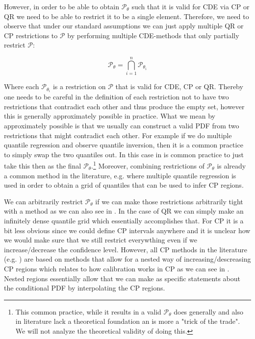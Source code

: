 However, in order to be able to obtain $\mathcal{P}_\theta$ such that it is valid for CDE via CP or QR we need to be able to restrict it to be a single element. Therefore, we need to observe that under our standard assumptions %
we can just apply multiple QR or CP restrictions to $\mathcal{P}$ by performing multiple CDE-methods that only partially restrict $\mathcal{P}$:

\begin{equation}
    \mathcal{P}_{\theta} = \bigcap_{i=1}^n \mathcal{P}_{\theta_i}
\end{equation}

Where each $\mathcal{P}_{\theta_i}$ is a restriction on $\mathcal{P}$ that is valid for CDE, CP or QR. Thereby one needs to be careful in the definition of each restriction not to have two restrictions that contradict each other and thus produce the empty set, however this is generally approximately possible in practice. What we mean by approximately possible is that we usually can construct a valid PDF from two restrictions that might contradict each other. For example if we do multiple quantile regression and observe quantile inversion, then it is a common practice to simply swap the two quantiles out. In this case in is common practice to just take this then as the final $\mathcal{P}_{\theta}$.\footnote{This common practice, while it results in a valid $\mathcal{P}_{\theta}$ does generally and also in literature lack a theoretical foundation an is more a "trick of the trade". We will not analyze the theoretical validity of doing this.} Moreover, combining restrictions of $\mathcal{P}_\theta$ is already a common method in the literature, e.g. \cite{sesia2021conformal} where multiple quantile regression is used in order to obtain a grid of quantiles that can be used to infer CP regions.

We can arbitrarily restrict $\mathcal{P}_\theta$ if we can make those restrictions arbitrarily tight with a method as we can also see in . In the case of QR we can simply make an infinitely dense quantile grid which essentially accomplishes that. For CP it is a bit less obvious since we could define CP intervals anywhere and it is unclear how we would make sure that we still restrict everywthing even if we increase/decrease the confidence level. However, all CP methods in the literature (e.g. \cite{sesia2021conformal, chernozhukov2021distributional}) are based on methods that allow for a nested way of increasing/descreasing CP regions which relates to how calibration works in CP as we can see in . Nested regions essentially allow that we can make as specific statements about the conditional PDF by interpolating the CP regions.

